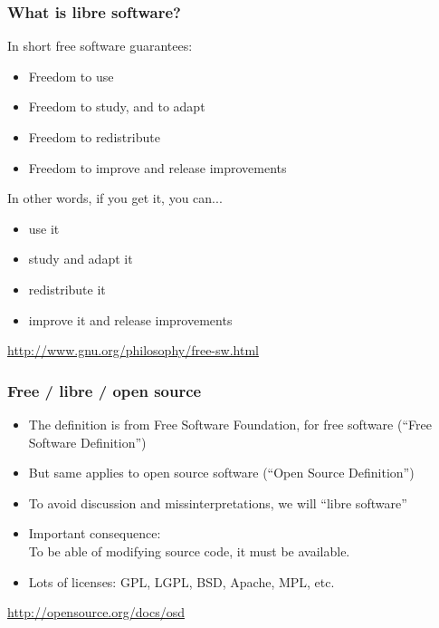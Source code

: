 \begin{frame}
\frametitle{What is libre software?}

In short free software guarantees:

\begin{itemize}
\item Freedom to use
\item Freedom to study, and to adapt
\item Freedom to redistribute
\item Freedom to improve and release improvements
\end{itemize}

In other words, if you get it, you can...

\begin{itemize}
\item use it
\item study and adapt it
\item redistribute it
\item improve it and release improvements
\end{itemize}
\vspace{.2cm}
\begin{flushright}
\url{http://www.gnu.org/philosophy/free-sw.html}
\end{flushright}

\end{frame}



\begin{frame}
\frametitle{Free / libre / open source}

\begin{itemize}
\item The definition is from Free Software Foundation, for free
  software (``Free Software Definition'')

\item But same applies to open source software (``Open Source Definition'')

\item To avoid discussion and missinterpretations, we will ``libre software''

\item Important consequence: \\
  To be able of modifying source code, it must be available.

\item Lots of licenses: GPL, LGPL, BSD, Apache, MPL, etc.
\end{itemize}

\vspace{.2cm}

\begin{flushright}
\url{http://opensource.org/docs/osd}
\end{flushright}

\end{frame}


